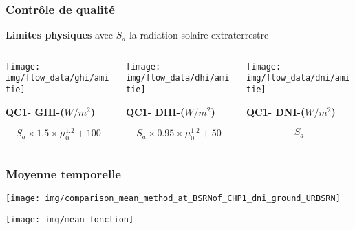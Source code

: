 \documentclass[8pt]{beamer}
\begin{document}
\begin{frame}
	\frametitle{Contrôle de qualité}
	\small %
	\vspace{0.1cm}
	\begin{center}
		\textbf{Limites physiques} avec $S_a$ la radiation solaire extraterrestre
	\end{center}
	
	\begin{columns}[T] %
		\begin{column}{0.3\linewidth} %
			\texttt{[image: img/flow\_data/ghi/amitie]}\\[1 pt]
			\begin{center}
				\textbf{QC1- GHI-($W/m^2$)}
			\end{center}
			\begin{equation}
				S_a \times 1.5 \times \mu_0^{1.2} + 100
			\end{equation}
		\end{column}
		\begin{column}{0.3\linewidth} %
			\texttt{[image: img/flow\_data/dhi/amitie]}\\[1pt]
			\begin{center}
				\textbf{QC1- DHI-($W/m^2$)}
			\end{center}
			\begin{equation}
				S_a \times 0.95 \times \mu_0^{1.2} + 50
			\end{equation}
		\end{column}
		\begin{column}{0.3\linewidth} %
			\texttt{[image: img/flow\_data/dni/amitie]}\\[1pt]
			\begin{center}
				\textbf{QC1- DNI-($W/m^2$)}
			\end{center}
			\begin{equation}
				S_a
			\end{equation}
		\end{column}
	\end{columns}
\end{frame}

\begin{frame}
	\frametitle{Moyenne temporelle}
	
	\begin{minipage}[c][\textheight][t]{0.58\textwidth}
		\centering
		\texttt{[image: img/comparison\_mean\_method\_at\_BSRNof\_CHP1\_dni\_ground\_URBSRN]}
	\end{minipage}
	\hfill
	\begin{minipage}[c][\textheight][t]{0.37\textwidth}
		\centering
		\texttt{[image: img/mean\_fonction]}
	\end{minipage}
\end{frame}
\end{document}
